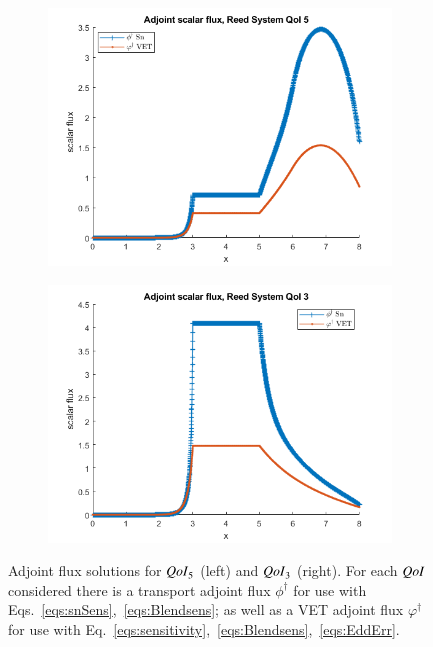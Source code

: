 \documentclass{anstrans}
\newcommand{\qoi}{{\it QoI}\xspace}
\begin{document}
\begin{figure}[h]
\centering
\begin{subfigure}{.25\textwidth}
  \centering
  \includegraphics[width=.98\linewidth]{774phia.png}
\end{subfigure}%
\begin{subfigure}{.25\textwidth}
  \centering
  \includegraphics[width=.98\linewidth]{772phia.png}
\end{subfigure}
\caption{Adjoint flux solutions for $\qoi_5$ (left) and $\qoi_3$ (right). For each $\qoi$ considered there is a transport adjoint flux $\phi^\dag$ for use with Eqs.~\eqref{eqs:snSens},~\eqref{eqs:Blendsens}; as well as a VET adjoint flux $\varphi^\dag$ for use with Eq.~\eqref{eqs:sensitivity},~\eqref{eqs:Blendsens},~\eqref{eqs:EddErr}.}
\label{fig:adj}
\end{figure}
\end{document}
